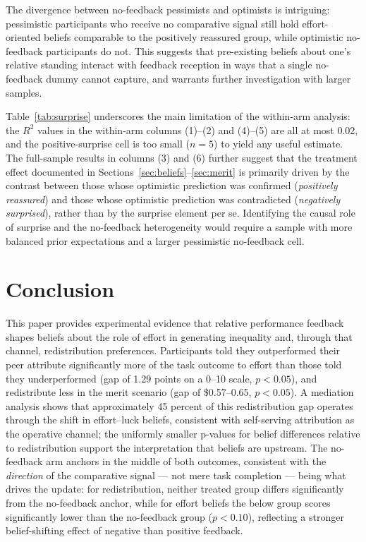 \documentclass[12pt]{article}
\begin{document}
The divergence between no-feedback pessimists and optimists is intriguing:
pessimistic participants who receive no comparative signal still hold
effort-oriented beliefs comparable to the positively reassured group,
while optimistic no-feedback participants do not.
This suggests that pre-existing beliefs about one's relative standing
interact with feedback reception in ways that a single no-feedback dummy
cannot capture, and warrants further investigation with larger samples.

Table~\ref{tab:surprise} underscores the main limitation of the
within-arm analysis: the $R^{2}$ values in the within-arm columns
(1)--(2) and (4)--(5) are all at most 0.02, and the positive-surprise
cell is too small ($n = 5$) to yield any useful estimate.
The full-sample results in columns (3) and (6) further suggest that the
treatment effect documented in Sections~\ref{sec:beliefs}--\ref{sec:merit}
is primarily driven by the contrast between those whose optimistic
prediction was confirmed (\emph{positively reassured}) and those whose
optimistic prediction was contradicted (\emph{negatively surprised}),
rather than by the surprise element per se.
Identifying the causal role of surprise and the no-feedback heterogeneity
would require a sample with more balanced prior expectations and a larger
pessimistic no-feedback cell.



\section{Conclusion}
\label{sec:conclusion}

This paper provides experimental evidence that relative performance feedback
shapes beliefs about the role of effort in generating inequality and, through
that channel, redistribution preferences.
Participants told they outperformed their peer attribute significantly more of
the task outcome to effort than those told they underperformed (gap of 1.29
points on a 0--10 scale, $p < 0.05$), and redistribute less in the merit
scenario (gap of \$0.57--0.65, $p < 0.05$).
A mediation analysis shows that approximately 45 percent of this redistribution
gap operates through the shift in effort--luck beliefs, consistent with
self-serving attribution as the operative channel; the uniformly smaller
p-values for belief differences relative to redistribution support the
interpretation that beliefs are upstream.
The no-feedback arm anchors in the middle of both outcomes, consistent with
the \emph{direction} of the comparative signal --- not mere task completion
--- being what drives the update: for redistribution, neither treated group
differs significantly from the no-feedback anchor, while for effort beliefs
the below group scores significantly lower than the no-feedback group
($p < 0.10$), reflecting a stronger belief-shifting effect of negative than
positive feedback.
\end{document}
